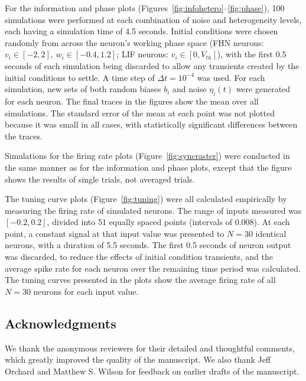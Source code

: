 \documentclass[letterpaper,11pt]{article}
\begin{document}
For the information and phase plots (Figures~\ref{fig:infohetero}--\ref{fig:phase}), 100 simulations were performed at each combination of noise and heterogeneity levels, each having a simulation time of 4.5 seconds. Initial conditions were chosen randomly from across the neuron's working phase space (FHN neurons: $v_i \in [-2, 2]$, $w_i \in [-0.4, 1.2]$; LIF neurons: $v_i \in [0, V_{th}]$), with the first 0.5 seconds of each simulation being discarded to allow any transients created by the initial conditions to settle. A time step of $\Delta t = 10^{-4}$ was used. For each simulation, new sets of both random biases $b_i$ and noise $\eta_i(t)$ were generated for each neuron. The final traces in the figures show the mean over all simulations. The standard error of the mean at each point was not plotted because it was small in all cases, with statistically significant differences between the traces.

Simulations for the firing rate plots (Figure~\ref{fig:syncraster}) were conducted in the same manner as for the information and phase plots, except that the figure shows the results of single trials, not averaged trials.

The tuning curve plots (Figure~\ref{fig:tuning}) were all calculated empirically by measuring the firing rate of simulated neurons. The range of inputs measured was $[-0.2, 0.2]$, divided into 51 equally spaced points (intervals of $0.008$). At each point, a constant signal at that input value was presented to $N = 30$ identical neurons, with a duration of 5.5 seconds. The first 0.5 seconds of neuron output was discarded, to reduce the effects of initial condition transients, and the average spike rate for each neuron over the remaining time period was calculated.
The tuning curves presented in the plots show the average firing rate of all $N = 30$ neurons for each input value.

\subsection*{Acknowledgments}

We thank the anonymous reviewers for their detailed and thoughtful comments, which greatly improved the quality of the manuscript.
We also thank Jeff Orchard and Matthew S. Wilson for feedback on earlier drafts of the manuscript.
\end{document}
